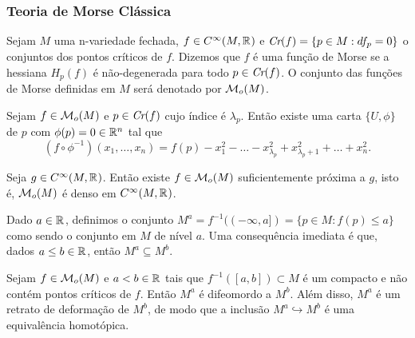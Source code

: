\documentclass{beamer}
\begin{document}
	\begin{frame}
		\frametitle{Teoria de Morse Clássica}
		\begin{definicao}
			Sejam $M$ uma n-variedade fechada, $f \in C^{\infty}(M, \mathbb{R}^{})$ e $\textit{Cr}(f) = \{p \in M: df_{p} = 0\}$ o conjuntos dos pontos críticos de $f$. Dizemos que $f$ é uma função de Morse se a hessiana $H_{p}(f)$ é não-degenerada para todo $p \in \textit{Cr}(f)$. O conjunto das funções de Morse definidas em $M$ será denotado por $\mathcal{M}_{o}(M)$. 
		\end{definicao}
		\begin{lema}
			Sejam $f \in \mathcal{M}_{o}(M)$ e $p \in \textit{Cr}(f)$ cujo índice é $\lambda_{p}$. Então existe uma carta $\{U, \phi\}$ de $p$ com $\phi(p)=0 \in \mathbb{R}^{n}$ tal que 
			$$
			(f\circ \phi^{-1})(x_{1}, \dots, x_{n}) = f(p)-x_{1}^{2}-\dots -x^{2}_{\lambda_{p}}+x^{2}_{\lambda_{p}+1}+\dots + x^{2}_{n}.
			$$
		\end{lema}
	\end{frame}
	
	\begin{frame}
		
		\begin{teorema}
			Seja $g\in C^{\infty}(M, \mathbb{R}^{})$. Então existe $f \in \mathcal{M}_{o}(M)$ suficientemente próxima a $g$, isto é, $\mathcal{M}_{o}(M)$ é denso em $C^{\infty}(M, \mathbb{R}^{})$.
		\end{teorema}
	\end{frame}
	
	\begin{frame}
			Dado $a \in \mathbb{R}^{}$, definimos o conjunto $M^{a}= f^{-1}((-\infty, a]) = \{p \in M: f(p)\leq a\}$ como sendo o conjunto em $M$ de nível $a$. Uma consequência imediata é que, dados $a\leq b \in \mathbb{R}^{}$, então $M^{a} \subseteq M^{b}$.
			
			\pause
			\begin{teorema}
				Sejam $f \in \mathcal{M}_{o}(M)$ e $a<b \in \mathbb{R}^{}$ tais que $f^{-1}([a,b])\subset M$ é um compacto e não contém pontos críticos de $f$. Então $M^{a}$ é difeomordo a $M^{b}$. Além disso, $M^{a}$ é um retrato de deformação de $M^{b}$, de modo que a inclusão  $M^{a} \hookrightarrow M^{b}$ é uma equivalência homotópica.
			\end{teorema}
			
	\end{frame}
	
\end{document}
